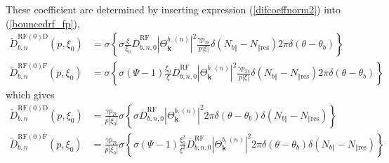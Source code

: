 These coefficient are determined by inserting expression (\ref{difcoeffnorm2})
into (\ref{bouncedrf_fp}),%
\begin{align}
\widetilde{D}_{b,n}^{\text{RF}(0)\text{D}}(p,\xi_{0}) &  =\sigma\left\{
\sigma\frac{\xi}{\xi_{0}}\overline{D}_{b,n,0}^{\text{RF}}\left|
\Theta_{\mathbf{k}}^{b,\left(  n\right)  }\right|  ^{2}\frac{\gamma p_{Te}%
}{p\left|  \xi\right|  }\delta\left(  N_{b\Vert}-N_{\Vert\text{res}}\right)
2\pi\delta\left(  \theta-\theta_{b}\right)  \right\}  \\
\widetilde{D}_{b,n}^{\text{RF}(0)\text{F}}(p,\xi_{0}) &  =\sigma\left\{
\sigma\left(  \Psi-1\right)  \frac{\xi_{0}}{\xi}\overline{D}_{b,n,0}%
^{\text{RF}}\left|  \Theta_{\mathbf{k}}^{b,\left(  n\right)  }\right|
^{2}\frac{\gamma p_{Te}}{p\left|  \xi\right|  }\delta\left(  N_{b\Vert
}-N_{\Vert\text{res}}\right)  2\pi\delta\left(  \theta-\theta_{b}\right)
\right\}  \nonumber
\end{align}
which gives%
\begin{align}
\widetilde{D}_{b,n}^{\text{RF}(0)\text{D}}(p,\xi_{0}) &  =\frac{\gamma p_{Te}%
}{p\left|  \xi_{0}\right|  }\sigma\left\{  \sigma\overline{D}_{b,n,0}%
^{\text{RF}}\left|  \Theta_{\mathbf{k}}^{b,\left(  n\right)  }\right|
^{2}2\pi\delta\left(  \theta-\theta_{b}\right)  \delta\left(  N_{b\Vert
}-N_{\Vert\text{res}}\right)  \right\}  \\
\widetilde{D}_{b,n}^{\text{RF}(0)\text{F}}(p,\xi_{0}) &  =\frac{\gamma p_{Te}%
}{p\left|  \xi_{0}\right|  }\sigma\left\{  \sigma\left(  \Psi-1\right)
\frac{\xi_{0}^{2}}{\xi^{2}}\overline{D}_{b,n,0}^{\text{RF}}\left|
\Theta_{\mathbf{k}}^{b,\left(  n\right)  }\right|  ^{2}2\pi\delta\left(
\theta-\theta_{b}\right)  \delta\left(  N_{b\Vert}-N_{\Vert\text{res}}\right)
\right\}  \nonumber
\end{align}

